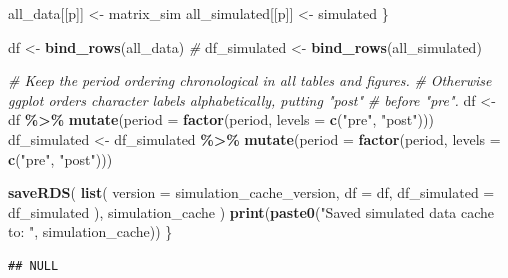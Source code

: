 \documentclass[
]{article}
\newenvironment{Shaded}{\begin{snugshade}}{\end{snugshade}}
\newcommand{\AttributeTok}[1]{\textcolor[rgb]{0.13,0.29,0.53}{#1}}
\newcommand{\CommentTok}[1]{\textcolor[rgb]{0.56,0.35,0.01}{\textit{#1}}}
\newcommand{\FunctionTok}[1]{\textcolor[rgb]{0.13,0.29,0.53}{\textbf{#1}}}
\newcommand{\NormalTok}[1]{#1}
\newcommand{\OtherTok}[1]{\textcolor[rgb]{0.56,0.35,0.01}{#1}}
\newcommand{\SpecialCharTok}[1]{\textcolor[rgb]{0.81,0.36,0.00}{\textbf{#1}}}
\newcommand{\StringTok}[1]{\textcolor[rgb]{0.31,0.60,0.02}{#1}}
\begin{document}
\begin{Shaded}
\begin{Highlighting}[]
\NormalTok{        all\_data[[p]] }\OtherTok{\textless{}{-}}\NormalTok{ matrix\_sim}
\NormalTok{        all\_simulated[[p]] }\OtherTok{\textless{}{-}}\NormalTok{ simulated}
\NormalTok{    \}}

\NormalTok{    df }\OtherTok{\textless{}{-}} \FunctionTok{bind\_rows}\NormalTok{(all\_data) }\CommentTok{\#}
\NormalTok{    df\_simulated }\OtherTok{\textless{}{-}} \FunctionTok{bind\_rows}\NormalTok{(all\_simulated)}

    \CommentTok{\# Keep the period ordering chronological in all tables and figures.}
    \CommentTok{\# Otherwise ggplot orders character labels alphabetically, putting "post"}
    \CommentTok{\# before "pre".}
\NormalTok{    df }\OtherTok{\textless{}{-}}\NormalTok{ df }\SpecialCharTok{\%\textgreater{}\%}
        \FunctionTok{mutate}\NormalTok{(}\AttributeTok{period =} \FunctionTok{factor}\NormalTok{(period, }\AttributeTok{levels =} \FunctionTok{c}\NormalTok{(}\StringTok{"pre"}\NormalTok{, }\StringTok{"post"}\NormalTok{)))}
\NormalTok{    df\_simulated }\OtherTok{\textless{}{-}}\NormalTok{ df\_simulated }\SpecialCharTok{\%\textgreater{}\%}
        \FunctionTok{mutate}\NormalTok{(}\AttributeTok{period =} \FunctionTok{factor}\NormalTok{(period, }\AttributeTok{levels =} \FunctionTok{c}\NormalTok{(}\StringTok{"pre"}\NormalTok{, }\StringTok{"post"}\NormalTok{)))}

    \FunctionTok{saveRDS}\NormalTok{(}
        \FunctionTok{list}\NormalTok{(}
            \AttributeTok{version =}\NormalTok{ simulation\_cache\_version,}
            \AttributeTok{df =}\NormalTok{ df,}
            \AttributeTok{df\_simulated =}\NormalTok{ df\_simulated}
\NormalTok{        ),}
\NormalTok{        simulation\_cache}
\NormalTok{    )}
    \FunctionTok{print}\NormalTok{(}\FunctionTok{paste0}\NormalTok{(}\StringTok{"Saved simulated data cache to: "}\NormalTok{, simulation\_cache))}
\NormalTok{\}}
\end{Highlighting}
\end{Shaded}

\begin{verbatim}
## NULL
\end{verbatim}
\end{document}
